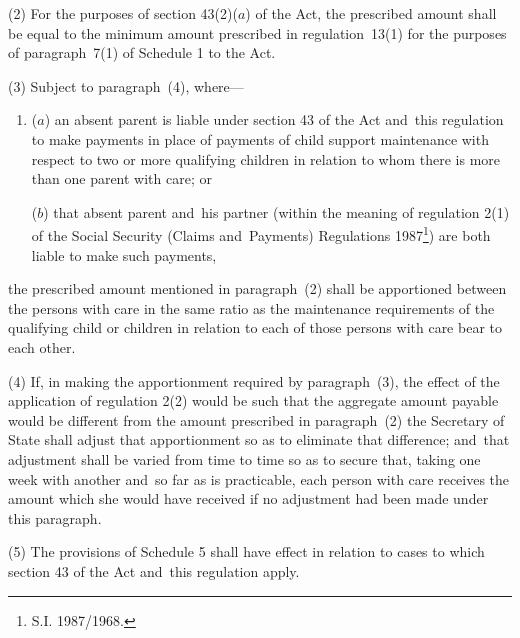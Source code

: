 \documentclass[12pt,a4paper]{article}
\begin{document}
(2) For the purposes of section 43(2)($a$) of the Act, the prescribed amount shall be equal to the minimum amount prescribed in regulation~13(1) for the purposes of paragraph~7(1) of Schedule 1 to the Act.

(3) Subject to paragraph~(4), where—
\begin{enumerate}\item[]
($a$) an absent parent is liable under section 43 of the Act and~this regulation to make payments in place of payments of child support maintenance with respect to two or more qualifying children in relation to whom there is more than one parent with care; or

($b$) that absent parent and~his partner (within the meaning of regulation 2(1) of the Social Security (Claims and~Payments) Regulations 1987\footnote{\frenchspacing S.I. 1987/1968.}) are both liable to make such payments,
\end{enumerate}
the prescribed amount mentioned in paragraph~(2) shall be apportioned between the persons with care in the same ratio as the maintenance requirements of the qualifying child or children in relation to each of those persons with care bear to each other.

(4) If, in making the apportionment required by paragraph~(3), the effect of the application of regulation 2(2) would be such that the aggregate amount payable would be different from the amount prescribed in paragraph~(2) the Secretary of State shall adjust that apportionment so as to eliminate that difference; and~that adjustment shall be varied from time to time so as to secure that, taking one week with another and~so far as is practicable, each person with care receives the amount which she would have received if no adjustment had been made under this paragraph.

(5) The provisions of Schedule 5 shall have effect in relation to cases to which section 43 of the Act and~this regulation apply.
\end{document}
